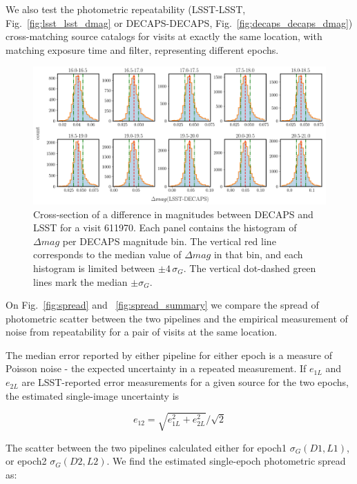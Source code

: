\documentclass[DM,lsstdraft,toc,usenatbib]{lsstdoc}
\begin{document}
We also test the photometric repeatability (LSST-LSST, Fig.~\ref{fig:lsst_lsst_dmag} or DECAPS-DECAPS, Fig.~\ref{fig:decaps_decaps_dmag}) cross-matching  source catalogs for visits at exactly the same location, with matching exposure time and filter, representing different epochs.  


\begin{figure}
\begin{centering}
\includegraphics[width=1.1\columnwidth]{figs/rms_decaps_lsst_611970hist_panel.png}
\caption{Cross-section of a difference in magnitudes between DECAPS and LSST for a visit 611970. Each panel contains the histogram of $\Delta mag$ per DECAPS magnitude bin. The vertical red line corresponds to the median value of $\Delta mag$ in that bin, and each histogram is limited between $\pm 4 \, \sigma_{G}$. The vertical dot-dashed green lines mark the median $\pm \sigma_{G}$. }
\label{fig:dmag_hist}
\end{centering}
\end{figure} 


On Fig.~\ref{fig:spread} and ~\ref{fig:spread_summary} we compare the spread of photometric scatter between the two pipelines and  the empirical measurement of noise from repeatability for a pair of visits at the same location. 

The median error reported by either pipeline for either epoch is a measure of Poisson noise - the expected uncertainty in a repeated measurement.  If $e_{1L}$ and $e_{2L}$ are LSST-reported error measurements for a given source for the two epochs,  the estimated single-image uncertainty is  

\begin{equation}
\label{eq:error}
e_{12} = \sqrt{e_{1L}^{2} + e_{2L}^{2}} / \sqrt{2}
\end{equation}


The scatter between the two pipelines calculated either for epoch1  $\sigma_{G}(D1,L1)$, or epoch2 $\sigma_{G}(D2,L2)$. We find the estimated single-epoch photometric spread as:
\end{document}
